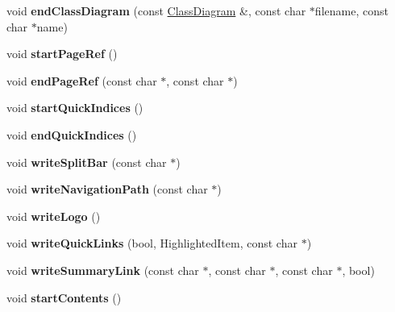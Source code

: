 \begin{DoxyCompactItemize}
void {\bfseries end\+Class\+Diagram} (const \mbox{\hyperlink{class_class_diagram}{Class\+Diagram}} \&, const char $\ast$filename, const char $\ast$name)
\item 
\mbox{\label{class_r_t_f_generator_acfe100fa82bd9c75629790a719a6f711}} 
void {\bfseries start\+Page\+Ref} ()
\item 
\mbox{\label{class_r_t_f_generator_af6443e553d28dc4b34cfed6567c530c7}} 
void {\bfseries end\+Page\+Ref} (const char $\ast$, const char $\ast$)
\item 
\mbox{\label{class_r_t_f_generator_aa9a8e0a9531e1dd82931a2a8c0572500}} 
void {\bfseries start\+Quick\+Indices} ()
\item 
\mbox{\label{class_r_t_f_generator_a1e804272e7498124acf895be2bcdb35a}} 
void {\bfseries end\+Quick\+Indices} ()
\item 
\mbox{\label{class_r_t_f_generator_a94c98bdf4ad6589a902e283cb3a31995}} 
void {\bfseries write\+Split\+Bar} (const char $\ast$)
\item 
\mbox{\label{class_r_t_f_generator_ae9e70a811ebae6face08d0c2c019af16}} 
void {\bfseries write\+Navigation\+Path} (const char $\ast$)
\item 
\mbox{\label{class_r_t_f_generator_a94f7432f76fdcce01b1706170cd6c433}} 
void {\bfseries write\+Logo} ()
\item 
\mbox{\label{class_r_t_f_generator_a7bfd450f1bfcdb82217da1e88646f030}} 
void {\bfseries write\+Quick\+Links} (bool, Highlighted\+Item, const char $\ast$)
\item 
\mbox{\label{class_r_t_f_generator_acdcae4f58554de53360da212e0d9065a}} 
void {\bfseries write\+Summary\+Link} (const char $\ast$, const char $\ast$, const char $\ast$, bool)
\item 
\mbox{\label{class_r_t_f_generator_a59a9e3d72221d5ca1cd6d37ac243b3bc}} 
void {\bfseries start\+Contents} ()
\item 

\end{DoxyCompactItemize}
